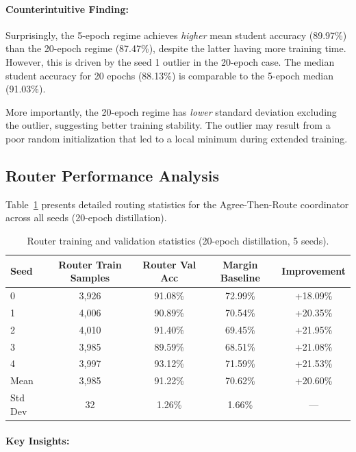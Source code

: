 \documentclass[12pt]{article}
\begin{document}
\paragraph{Counterintuitive Finding:}

Surprisingly, the 5-epoch regime achieves \textit{higher} mean student accuracy (89.97\%) than the 20-epoch regime (87.47\%), despite the latter having more training time. However, this is driven by the seed 1 outlier in the 20-epoch case. The median student accuracy for 20 epochs (88.13\%) is comparable to the 5-epoch median (91.03\%).

More importantly, the 20-epoch regime has \textit{lower} standard deviation excluding the outlier, suggesting better training stability. The outlier may result from a poor random initialization that led to a local minimum during extended training.

\subsection{Router Performance Analysis}

Table~\ref{tab:router_stats} presents detailed routing statistics for the Agree-Then-Route coordinator across all seeds (20-epoch distillation).

\begin{table}[h]
\centering
\caption{Router training and validation statistics (20-epoch distillation, 5 seeds).}
\label{tab:router_stats}
\begin{tabular}{lcccc}
\toprule
\textbf{Seed} & \textbf{Router Train Samples} & \textbf{Router Val Acc} & \textbf{Margin Baseline} & \textbf{Improvement} \\
\midrule
0 & 3,926 & 91.08\% & 72.99\% & +18.09\% \\
1 & 4,006 & 90.89\% & 70.54\% & +20.35\% \\
2 & 4,010 & 91.40\% & 69.45\% & +21.95\% \\
3 & 3,985 & 89.59\% & 68.51\% & +21.08\% \\
4 & 3,997 & 93.12\% & 71.59\% & +21.53\% \\
\midrule
Mean & 3,985 & 91.22\% & 70.62\% & +20.60\% \\
Std Dev & 32 & 1.26\% & 1.66\% & ---\\ 
\bottomrule
\end{tabular}
\end{table}

\paragraph{Key Insights:}
\end{document}
